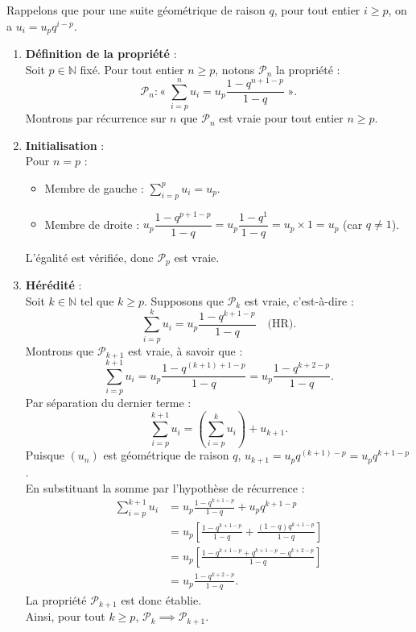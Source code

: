 \documentclass[11pt,a4paper]{article}
\newcommand{\N}{\mathbb{N}}
\begin{document}
\begin{correctionbox}
Rappelons que pour une suite géométrique de raison $q$, pour tout entier $i \ge p$, on a $u_i = u_p q^{i-p}$.

\begin{enumerate}[label=\textbf{\arabic*.}]
    \item \textbf{Définition de la propriété} :\\
    Soit $p \in \N$ fixé. Pour tout entier $n \ge p$, notons $\mathcal{P}_n$ la propriété :
    \[
    \mathcal{P}_n : « \; \sum_{i=p}^n u_i = u_p \frac{1 - q^{n+1-p}}{1 - q} \; ».
    \]
    Montrons par récurrence sur $n$ que $\mathcal{P}_n$ est vraie pour tout entier $n \ge p$.

    \item \textbf{Initialisation} :\\
    Pour $n = p$ :
    \begin{itemize}
        \item Membre de gauche : $\sum_{i=p}^p u_i = u_p$.
        \item Membre de droite : $u_p \dfrac{1 - q^{p+1-p}}{1 - q} = u_p \dfrac{1 - q^1}{1 - q} = u_p \times 1 = u_p$ (car $q \neq 1$).
    \end{itemize}
    L'égalité est vérifiée, donc $\mathcal{P}_p$ est vraie.

    \item \textbf{Hérédité} :\\
    Soit $k \in \N$ tel que $k \ge p$. Supposons que $\mathcal{P}_k$ est vraie, c'est-à-dire :
    \[
    \sum_{i=p}^k u_i = u_p \frac{1 - q^{k+1-p}}{1 - q} \quad \text{(HR)}.
    \]
    Montrons que $\mathcal{P}_{k+1}$ est vraie, à savoir que :
    \[
    \sum_{i=p}^{k+1} u_i = u_p \frac{1 - q^{(k+1)+1-p}}{1 - q} = u_p \frac{1 - q^{k+2-p}}{1 - q}.
    \]
    Par séparation du dernier terme :
    \[
    \sum_{i=p}^{k+1} u_i = \left(\sum_{i=p}^k u_i\right) + u_{k+1}.
    \]
    Puisque $(u_n)$ est géométrique de raison $q$, $u_{k+1} = u_p q^{(k+1)-p} = u_p q^{k+1-p}$.\\
    En substituant la somme par l'hypothèse de récurrence :
    \begin{align*}
    \sum_{i=p}^{k+1} u_i &= u_p \frac{1 - q^{k+1-p}}{1 - q} + u_p q^{k+1-p} \\
                        &= u_p \left[ \frac{1 - q^{k+1-p}}{1 - q} + \frac{(1-q)q^{k+1-p}}{1 - q} \right] \\
                        &= u_p \left[ \frac{1 - q^{k+1-p} + q^{k+1-p} - q^{k+2-p}}{1 - q} \right] \\
                        &= u_p \frac{1 - q^{k+2-p}}{1 - q}.
    \end{align*}
    La propriété $\mathcal{P}_{k+1}$ est donc établie.\\
    Ainsi, pour tout $k \ge p$, $\mathcal{P}_k \implies \mathcal{P}_{k+1}$.


\end{enumerate}
\end{correctionbox}
\end{document}
